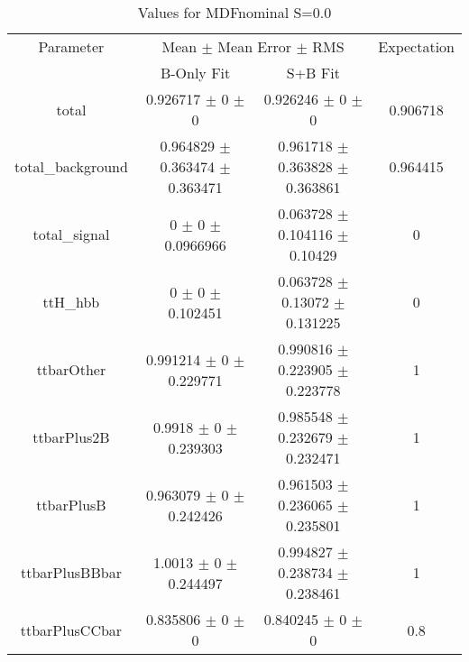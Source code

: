 \begin{table}
\centering
\caption{Values for MDFnominal S=0.0}
\begin{tabular}{cccc}
\toprule
Parameter & \multicolumn{2}{c}{Mean $\pm$ Mean Error $\pm$ RMS} & Expectation\\
 & B-Only Fit & S+B Fit & \\
\midrule
total & \num{0.926717} $\pm$ \num{0} $\pm$ \num{0} & \num{0.926246} $\pm$ \num{0} $\pm$ \num{0} & \num{0.906718}\\
total\_background & \num{0.964829} $\pm$ \num{0.363474} $\pm$ \num{0.363471} & \num{0.961718} $\pm$ \num{0.363828} $\pm$ \num{0.363861} & \num{0.964415}\\
total\_signal & \num{0} $\pm$ \num{0} $\pm$ \num{0.0966966} & \num{0.063728} $\pm$ \num{0.104116} $\pm$ \num{0.10429} & \num{0}\\
ttH\_hbb & \num{0} $\pm$ \num{0} $\pm$ \num{0.102451} & \num{0.063728} $\pm$ \num{0.13072} $\pm$ \num{0.131225} & \num{0}\\
ttbarOther & \num{0.991214} $\pm$ \num{0} $\pm$ \num{0.229771} & \num{0.990816} $\pm$ \num{0.223905} $\pm$ \num{0.223778} & \num{1}\\
ttbarPlus2B & \num{0.9918} $\pm$ \num{0} $\pm$ \num{0.239303} & \num{0.985548} $\pm$ \num{0.232679} $\pm$ \num{0.232471} & \num{1}\\
ttbarPlusB & \num{0.963079} $\pm$ \num{0} $\pm$ \num{0.242426} & \num{0.961503} $\pm$ \num{0.236065} $\pm$ \num{0.235801} & \num{1}\\
ttbarPlusBBbar & \num{1.0013} $\pm$ \num{0} $\pm$ \num{0.244497} & \num{0.994827} $\pm$ \num{0.238734} $\pm$ \num{0.238461} & \num{1}\\
ttbarPlusCCbar & \num{0.835806} $\pm$ \num{0} $\pm$ \num{0} & \num{0.840245} $\pm$ \num{0} $\pm$ \num{0} & \num{0.8}\\
\bottomrule
\end{tabular}
\end{table}